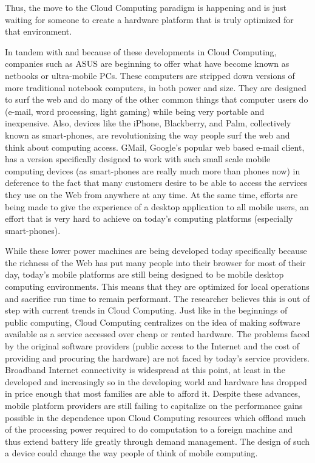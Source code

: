 \documentclass[12pt,oneside,letterpaper,titlepage]{report}
\begin{document}
Thus, the move to the Cloud Computing paradigm is happening and is just waiting
for someone to create a hardware platform that is truly optimized for that
environment.


In tandem with and because of these developments in Cloud Computing, companies
such as ASUS are beginning to offer what have become known as netbooks or
ultra-mobile PCs.  These computers are stripped down versions of more
traditional notebook computers, in both power and size.  They are designed to
surf the web and do many of the other common things that computer users do
(e-mail, word processing, light gaming) while being very portable and
inexpensive.  Also, devices like the iPhone, Blackberry, and Palm, collectively
known as smart-phones, are revolutionizing the way people surf the web and think
about computing access.  GMail, Google's popular web based e-mail client, has a
version specifically designed to work with such small scale mobile computing
devices (as smart-phones are really much more than phones now) in deference to
the fact that many customers desire to be able to access the services they use
on the Web from anywhere at any time.  At the same time, efforts are being made
to give the experience of a desktop application to all mobile users, an effort
that is very hard to achieve on today's computing platforms (especially
smart-phones).

While these lower power machines are being developed today specifically because
the richness of the Web has put many people into their browser for most of their
day, today's mobile platforms are still being designed to be mobile desktop
computing environments.  This means that they are optimized for local operations
and sacrifice run time to remain performant.  The researcher believes this is
out of step with current trends in Cloud Computing.  Just like in the beginnings
of public computing, Cloud Computing centralizes on the idea of making software
available as a service accessed over cheap or rented hardware.  The problems
faced by the original software providers (public access to the Internet and the
cost of providing and procuring the hardware) are not faced by today's service
providers.  Broadband Internet connectivity is widespread at this point, at
least in the developed and increasingly so in the developing world and hardware
has dropped in price enough that most families are able to afford it.  Despite
these advances, mobile platform providers are still failing to capitalize on the
performance gains possible in the dependence upon Cloud Computing resources
which offload much of the processing power required to do computation to a
foreign machine and thus extend battery life greatly through demand management.
The design of such a device could change the way people of think of mobile
computing.
\end{document}
